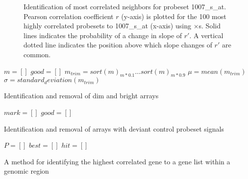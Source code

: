 \documentclass{bioinfo}
\begin{document}
\begin{figure}[!tpb]
\label{figure:cortip}
\centerline{}
\caption{Identification of most correlated neighbors for probeset 1007\_s\_at.
Pearson correlation coefficient $r$ (y-axis) is plotted for the 100 most highly
correlated probesets to 1007\_s\_at (x-axis) using $\times$s.  Solid lines
indicates the probability of a change in slope of $r\prime$.  A vertical dotted
line indicates the position above which slope changes of $r\prime$ are common.}
\end{figure}

\begin{algorithm}\label{algorithm:mprime}
\SetLine
{}

$m = []$\;
$good = []$\;
$m_{trim} = sort(m)_{m*0.1} \dots sort(m)_{m*0.9}$\;
$\mu    = mean(m_{trim})$\;
$\sigma = standard_deviation(m_{trim})$\;
\;
\caption{Identification and removal of dim and bright arrays}
\end{algorithm}

\begin{algorithm}\label{algorithm:mprimeprime}
\SetLine
{}

$mark = []$\;
$good = []$\;
\;
\caption{Identification and removal of arrays with deviant control probeset signals}
\end{algorithm}

\begin{algorithm}\label{algorithm:linkage}
\SetLine
{}
$P = []$\;
$best = []$\;
$hit = []$\;
\;
\caption{A method for identifying the highest correlated gene to a gene list
within a genomic region}
\end{algorithm}
\end{document}
